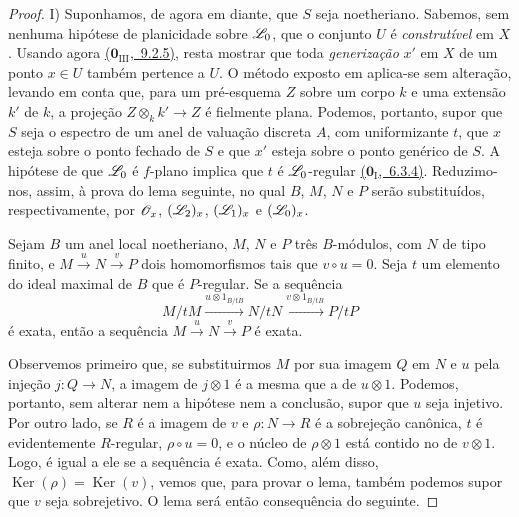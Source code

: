 \begin{proof}
\medskip
I) Suponhamos, de agora em diante, que $S$ seja noetheriano.
Sabemos, sem nenhuma hipótese de planicidade sobre $\mathscr{L}_0$,
que o conjunto $U$ é \emph{construtível} em $X$
. Usando agora
\hyperref[0.9.2.5]{($\mathbf{0}_{\mathrm{III}}$,~9.2.5)},
resta mostrar que toda \emph{generização} $x'$ em $X$ de
um ponto $x\in U$ também pertence a $U$.
O método exposto em  aplica-se sem alteração,
levando em conta que, para um pré-esquema $Z$ sobre um corpo
$k$ e uma extensão $k'$ de $k$, a projeção
$Z\otimes_k k'\to Z$ é fielmente plana.
Podemos, portanto, supor que $S$ seja o espectro de um anel
de valuação discreta $A$, com uniformizante $t$, que $x$ esteja
sobre o ponto fechado de $S$ e que $x'$ esteja sobre o ponto
genérico de $S$.
A hipótese de que $\mathscr{L}_0$ é $f$-plano implica que $t$ é
$\mathscr{L}_0$-regular
\hyperref[0.6.3.4]{($\mathbf{0}_{\mathrm{I}}$,~6.3.4)}.
Reduzimo-nos, assim, à prova do lema seguinte, no qual
$B$, $M$, $N$ e $P$ serão substituídos, respectivamente, por
$\mathscr{O}_x$, $(\mathscr{L}_2)_x$, $(\mathscr{L}_1)_x$ e $(\mathscr{L}_0)_x$.

\begin{lemma}[12.3.3.1]
\label{IV.12.3.3.1}
Sejam $B$ um anel local noetheriano, $M$, $N$ e $P$ três
$B$-módulos, com $N$ de tipo finito, e
$M\xrightarrow{u}N\xrightarrow{v}P$ dois homomorfismos
tais que $v\circ u=0$.
Seja $t$ um elemento do ideal maximal de $B$ que é $P$-regular.
Se a sequência
\begin{equation}
\tag{12.3.3.2}
\label{IV.12.3.3.2}
M/tM\xrightarrow{u\otimes1_{B/tB}}N/tN
\xrightarrow{v\otimes1_{B/tB}}P/tP
\end{equation}
é exata, então a sequência $M\xrightarrow{u}N\xrightarrow{v}P$
é exata.
\end{lemma}

Observemos primeiro que, se substituirmos $M$ por sua imagem
$Q$ em $N$ e $u$ pela injeção $j:Q\to N$, a imagem de
$j\otimes1$ é a mesma que a de $u\otimes1$.
Podemos, portanto, sem alterar nem a hipótese nem a conclusão,
supor que $u$ seja injetivo.
Por outro lado, se $R$ é a imagem de $v$ e $\rho:N\to R$
é a sobrejeção canônica, $t$ é evidentemente $R$-regular,
$\rho\circ u=0$, e o núcleo de $\rho\otimes1$ está contido
no de $v\otimes1$.
Logo, é igual a ele se a sequência  é
exata. Como, além disso,
$\operatorname{Ker}(\rho)=\operatorname{Ker}(v)$,
vemos que, para provar o lema, também podemos supor que
$v$ seja sobrejetivo. O lema será então consequência do seguinte.


\end{proof}
